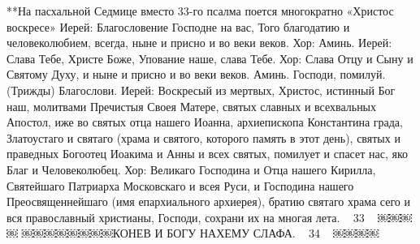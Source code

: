 **На пасхальной Седмице вместо 33-го псалма поется многократно «Христос воскресе»
Иерей: Благословение Господне на вас, Того благодатию и человеколюбием, всегда, ныне и присно и во веки веков.
Хор: Аминь.
Иерей: Слава Тебе, Христе Боже, Упование наше, слава Тебе.
Хор: Слава Отцу и Сыну и Святому Духу, и ныне и присно и во веки веков. Аминь. Господи, помилуй. (Трижды) Благослови.
Иерей: Воскресый из мертвых, Христос, истинный Бог наш, молитвами Пречистыя Своея Матере, святых славных и всехвальных Апостол, иже во святых отца нашего Иоанна, архиепископа Константина града, Златоустаго и святаго (храма и святого, которого память в этот день), святых и праведных Богоотец Иоакима и Анны и всех святых, помилует и спасет нас, яко Благ и Человеколюбец.
Хор: Великаго Господина и Отца нашего Кирилла, Святейшаго Патриарха Московскаго и всея Руси, и Господина нашего Преосвященнейшаго (имя епархиального архиерея), братию святаго храма сего и вся православный христианы, Господи, сохрани их на многая лета.
~ 33 ~
￼￼￼￼
￼￼￼￼￼￼￼￼КОНЕВ
И БОГУ НАХЕМУ СЛАФА.
~ 34 ~
￼￼￼￼
